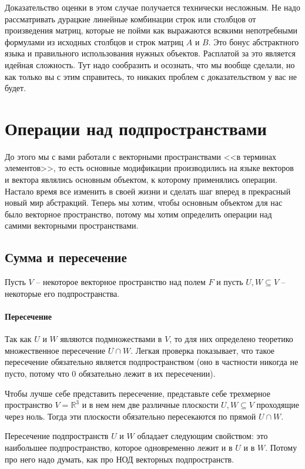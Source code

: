 Доказательство оценки в этом случае получается технически несложным.
Не надо рассматривать дурацкие линейные комбинации строк или столбцов от произведения матриц, которые не пойми как выражаются всякими непотребными формулами из исходных столбцов и строк матриц $A$ и $B$.
Это бонус абстрактного языка и правильного использования нужных объектов.
Расплатой за это является идейная сложность.
Тут надо сообразить и осознать, что мы вообще сделали, но как только вы с этим справитесь, то никаких проблем с доказательством у вас не будет.

\newpage
\section{Операции над подпространствами}

До этого мы с вами работали с векторными пространствами <<в терминах элементов>>, то есть основные модификации производились на языке векторов и вектора являлись основным объектом, к которому применялись операции.
Настало время все изменить в своей жизни и сделать шаг вперед в прекрасный новый мир абстракций.
Теперь мы хотим, чтобы основным объектом для нас было векторное пространство, потому мы хотим определить операции над самими векторными пространствами.

\subsection{Сумма и пересечение}

Пусть $V$ -- некоторое векторное пространство над полем $F$ и пусть $U, W \subseteq V$ -- некоторые его подпространства.

\paragraph{Пересечение}

Так как $U$ и $W$ являются подмножествами в $V$, то для них определено теоретико множественное пересечение $U\cap W$.
Легкая проверка показывает, что такое пересечение обязательно является подпространством (оно в частности никогда не пусто, потому что $0$ обязательно лежит в их пересечении).

Чтобы лучше себе представить пересечение, представьте себе трехмерное пространство $V = \mathbb R^3$ и в нем нем две различные плоскости $U,W\subseteq V$ проходящие через ноль.
Тогда эти плоскости обязательно пересекаются по прямой $U\cap W$.

Пересечение подпространств $U$ и $W$ обладает следующим свойством: это наибольшее подпространство, которое одновременно лежит и в $U$ и в $W$.
Потому про него надо думать, как про НОД векторных подпространств.

